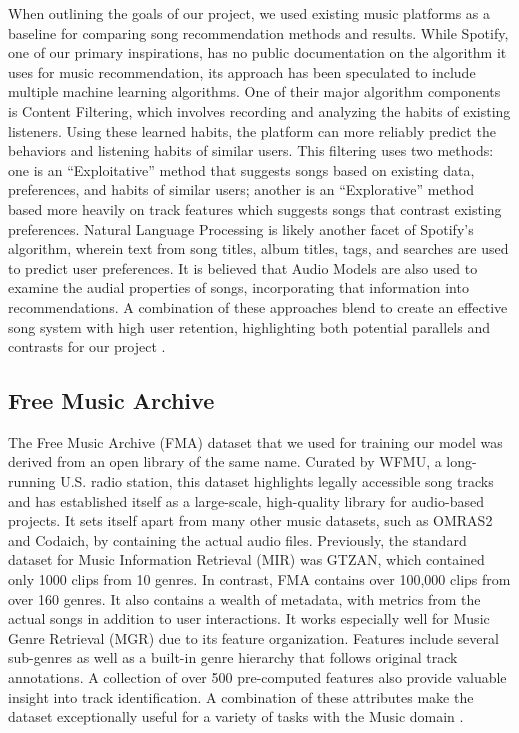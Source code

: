 When outlining the goals of our project, we used existing music platforms as a baseline for comparing song recommendation methods and results. While Spotify, one of our primary inspirations, has no public documentation on the algorithm it uses for music recommendation, its approach has been speculated to include multiple machine learning algorithms. One of their major algorithm components is Content Filtering, which involves recording and analyzing the habits of existing listeners. Using these learned habits, the platform can more reliably predict the behaviors and listening habits of similar users. This filtering uses two methods: one is an “Exploitative” method that suggests songs based on existing data, preferences, and habits of similar users; another is an “Explorative” method based more heavily on track features which suggests songs that contrast existing preferences. Natural Language Processing is likely another facet of Spotify’s algorithm, wherein text from song titles, album titles, tags, and searches are used to predict user preferences. It is believed that Audio Models are also used to examine the audial properties of songs, incorporating that information into recommendations. A combination of these approaches blend to create an effective song system with high user retention, highlighting both potential parallels and contrasts for our project \cite{spotify}.

\subsection{Free Music Archive}

The Free Music Archive (FMA) dataset that we used for training our model was derived from an open library of the same name. Curated by WFMU, a long-running U.S. radio station, this dataset highlights legally accessible song tracks and has established itself as a large-scale, high-quality library for audio-based projects. It sets itself apart from many other music datasets, such as OMRAS2 and Codaich, by containing the actual audio files. Previously, the standard dataset for Music Information Retrieval (MIR) was GTZAN, which contained only 1000 clips from 10 genres. In contrast, FMA contains over 100,000 clips from over 160 genres. It also contains a wealth of metadata, with metrics from the actual songs in addition to user interactions. It works especially well for Music Genre Retrieval (MGR) due to its feature organization. Features include several sub-genres as well as a built-in genre hierarchy that follows original track annotations. A collection of over 500 pre-computed features also provide valuable insight into track identification. A combination of these attributes make the dataset exceptionally useful for a variety of tasks with the Music domain \cite{FMA}.

